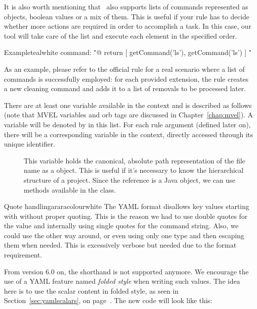 \begin{description}
\begin{description}
It is also worth mentioning that \arara\ also supports lists of commands represented as  objects, boolean values or a mix of them. This is useful if your rule has to decide whether more actions are required in order to accomplish a task. In this case, our tool will take care of the list and execute each element in the specified order.

\begin{codebox}{Example}{teal}{\icnote}{white}
command: "@{ return [ getCommand('ls'), getCommand('ls') ] }"
\end{codebox}

As an example, please refer to the official  rule for a real scenario where a list of commands is successfully employed: for each provided extension, the rule creates a new cleaning command and adds it to a list of removals to be processed later.

There are at least one variable available in the  context and is described as follows (note that MVEL variables and orb tags are discussed in Chapter~\ref{chap:mvel}). A variable will be denoted by  in this list. For each rule argument (defined later on), there will be a corresponding variable in the  context, directly accessed through its unique identifier.

\begin{description}
\item[] This variable holds the canonical, absolute path representation of the file name as a  object. This is useful if it's necessary to know the hierarchical structure of a project. Since the reference is a Java object, we can use methods available in the  class.
\end{description}

\begin{messagebox}{Quote handling}{araracolour}{\icinfo}{white}
\setlength{\parskip}{1em}
The YAML format disallows key values starting with  without proper quoting. This is the reason we had to use double quotes for the value and internally using single quotes for the command string. Also, we could use the other way around, or even using only one type and then escaping them when needed. This is excessively verbose but needed due to the format requirement. 

From version 6.0 on, the  shorthand is not supported anymore. We encourage the use of a YAML feature named \emph{folded style} when writing such values. The idea here is to use the scalar content in folded style, as seen in Section~\ref{sec:yamlscalars}, on page~\pageref{sec:yamlscalars}. The new code will look like this:


\end{messagebox}
\end{description}
\end{description}
